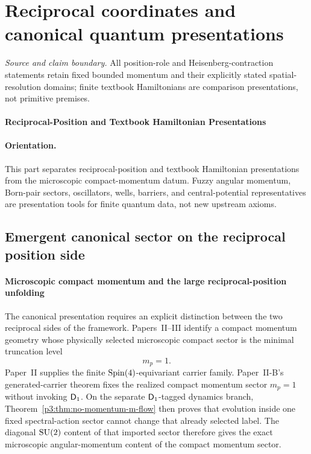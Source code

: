 \documentclass[12pt,a4paper]{article}
\begin{document}
\section{Reciprocal coordinates and canonical quantum presentations}
\label{p4a:sec:v238-a7}
\noindent\textit{Source and claim boundary.} All position-role and Heisenberg-contraction statements retain fixed bounded momentum and their explicitly stated spatial-resolution domains; finite textbook Hamiltonians are comparison presentations, not primitive premises.

\paragraph{Reciprocal-Position and Textbook Hamiltonian Presentations}
\label{p4:part:reciprocal-position-presentations}

\paragraph{Orientation.}
This part separates reciprocal-position and textbook Hamiltonian presentations from the microscopic compact-momentum datum.  Fuzzy angular momentum, Born-pair sectors, oscillators, wells, barriers, and central-potential representatives are presentation tools for finite quantum data, not new upstream axioms.



\subsection{Emergent canonical sector on the reciprocal position side}
\label{p4:sec:part2-canonical}



\paragraph{Microscopic compact momentum and the large reciprocal-position unfolding}
\label{p4:sec:part2-momentum-position-split}

The canonical presentation requires an explicit distinction between the two
reciprocal sides of the framework.  Papers~II--III identify a compact momentum
geometry whose physically selected microscopic compact sector is the minimal
truncation level
\begin{equation}
\label{p4:eq:m-momentum-physical}
m_p=1.
\end{equation}
Paper~II supplies the finite \(\mathrm{Spin}(4)\)-equivariant carrier family.
Paper~II-B's generated-carrier theorem fixes the realized
compact momentum sector \(m_p=1\) without invoking \(\mathsf{D}_1\).  On the
separate \(\mathsf{D}_1\)-tagged dynamics branch,
Theorem~\ref{p3:thm:no-momentum-m-flow} then proves that evolution inside one
fixed spectral-action sector cannot change that already selected label.  The
diagonal \(\mathrm{SU}(2)\) content of
that imported sector therefore gives the exact microscopic angular-momentum
content of the compact momentum sector.
\end{document}
